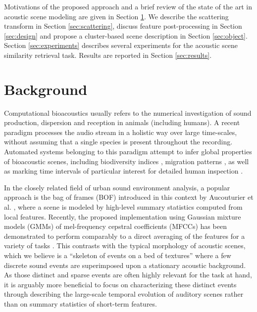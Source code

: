 \documentclass[smallextended]{svjour3}
\makeatletter
\newcommand*{\ie}{i.e.\@\xspace}
\makeatother
\begin{document}
Motivations of the proposed approach and a brief review of the state of the art in acoustic scene modeling are given in Section \ref{sec:soa}. We describe the scattering transform in Section \ref{sec:scattering}, discuss feature post-processing in Section \ref{sec:design} and propose a cluster-based scene description in Section \ref{sec:object}. Section \ref{sec:experiments} describes several experiments for the acoustic scene similarity retrieval task. Results are reported in Section \ref{sec:results}.

\section{Background} \label{sec:soa}


Computational bioacoustics usually refers to the numerical investigation of sound production, dispersion and reception in animals (including humans). A recent paradigm  processes the audio stream in a holistic way over large time-scales, without assuming that a single species is present throughout the recording. Automated systems belonging to this paradigm attempt to infer global properties of bioacoustic scenes, including biodiversity indices \cite{Bardeli2010}, migration patterns \cite{Obrist2010}, as well as marking time intervals of particular interest for detailed human inspection \cite{rosenstock2002landbird}.

In the closely related field of urban sound environment analysis, a popular approach is the bag of frames (BOF) introduced in this context by Aucouturier et al. \cite{aucouturier2007bag}, where a scene is modeled by high-level summary statistics computed from local features.
Recently, the proposed implementation using Gaussian mixture models (GMMs) of mel-frequency cepstral coefficients (MFCCs) has been demonstrated to perform comparably to a direct averaging of the features for a variety of tasks \cite{lagrange:hal-01082501}.
This contrasts with the typical morphology of acoustic scenes, which we believe is a ``skeleton of events on a bed of textures'' \cite{nelken2013} where a few discrete sound events are superimposed upon a stationary acoustic background.
As those distinct and sparse events are often highly relevant for the task at hand, it is arguably more beneficial to focus on characterizing these distinct events through describing the large-scale temporal evolution of auditory scenes rather than on summary statistics of short-term features.
\end{document}

